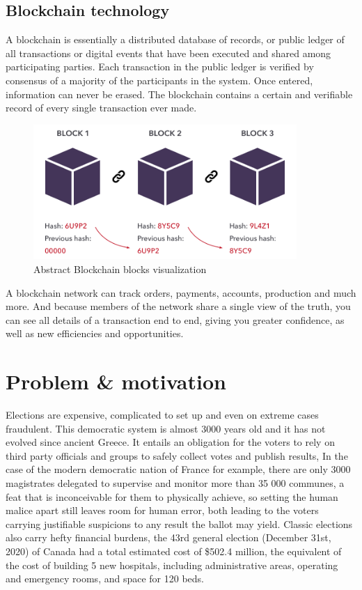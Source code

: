 \subsection{Blockchain technology}

A blockchain is essentially a distributed database of records, or public ledger of all transactions or digital events that have been executed and shared among participating parties. Each transaction in the public ledger is verified by consensus of a majority of the participants in the system. Once entered, information can never be erased. The blockchain contains a certain and verifiable record of every single transaction ever made\cite{michaelcrosbyBlockchainTechnologyBitcoin2016}.

\begin{figure}[h]
	\centering
		\includegraphics[width=10cm]{images/chapter1/blockchain.png}
		\caption{{\footnotesize Abstract Blockchain blocks visualization}}
\end{figure}

A blockchain network can track orders, payments, accounts, production and much more. And because members of the network share a single view of the truth, you can see all details of a transaction end to end, giving you greater confidence, as well as new efficiencies and opportunities.\newpage

\section{Problem \& motivation}

Elections are expensive, complicated to set up and even on extreme cases fraudulent. This democratic system is almost 3000 years old and it has not evolved since ancient Greece. It entails an obligation for the voters to rely on third party officials and groups to safely collect votes and publish results, In the case of the modern democratic nation of France for example, there are only 3000 magistrates delegated to supervise and monitor more than 35 000 communes\cite{republiquefrancaiseArticleLO274Code2021}, a feat that is inconceivable for them to physically achieve, so setting the human malice apart still leaves room for human error, both leading to the voters carrying justifiable suspicions to any result the ballot may yield. Classic elections also carry hefty financial burdens, the 43rd general election (December 31st, 2020) of Canada had a total estimated cost of \$502.4 million\cite{electionscanadaEstimatedCost43rd2021}, the equivalent of the cost of building 5 new hospitals, including administrative areas, operating and emergency rooms, and space for 120 beds\cite{fixrcompanyCostBuildHospital2020}.

